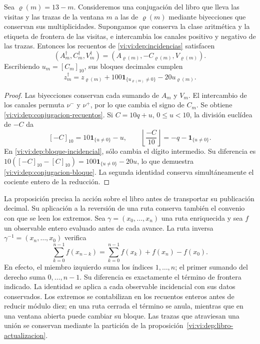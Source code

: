\begin{proposition}
\label{vi:vi:dep:conjugacion-incidencial}
Sea \(\varrho(m)=13-m\). Consideremos una conjugación del libro
que lleva las visitas y las trazas de la ventana \(m\) a las de
\(\varrho(m)\) mediante biyecciones que conservan sus multiplicidades.
Supongamos que conserva la clase aritmética y la etiqueta de frontera
de las visitas, e intercambia los canales positivo y negativo de las
trazas. Entonces los recuentos de \eqref{vi:vi:dep:incidencias} satisfacen
\begin{equation}
 (A_m^\dagger,C_m^\dagger,V_m^\dagger)
 =(A_{\varrho(m)},-C_{\varrho(m)},V_{\varrho(m)}).
 \label{vi:vi:dep:conjugacion-recuentos}
\end{equation}
Escribiendo \(u_m=[C_m]_{10}\), sus bloques decimales cumplen
\begin{equation}
 z_m^\dagger=z_{\varrho(m)}
       +100\mathbf1_{\{u_{\varrho(m)}\ne0\}}-20u_{\varrho(m)}.
 \label{vi:vi:dep:conjugacion-bloque}
\end{equation}
\end{proposition}
\begin{proof}
Las biyecciones conservan cada sumando de \(A_m\) y \(V_m\).
El intercambio de los canales permuta \(\nu^-\) y \(\nu^+\),
por lo que cambia el signo de \(C_m\). Se obtiene
\eqref{vi:vi:dep:conjugacion-recuentos}. Si \(C=10q+u\),
\(0\le u<10\), la división euclídea de \(-C\) da
\[
 [-C]_{10}=10\mathbf1_{\{u\ne0\}}-u,
 \qquad
 \left\lfloor\frac{-C}{10}\right\rfloor
 =-q-\mathbf1_{\{u\ne0\}}.
\]
En \eqref{vi:vi:dep:bloque-incidencial}, sólo cambia el dígito
intermedio. Su diferencia es
\(10([-C]_{10}-[C]_{10})=100\mathbf1_{\{u\ne0\}}-20u\),
lo que demuestra \eqref{vi:vi:dep:conjugacion-bloque}. La segunda
identidad conserva simultáneamente el cociente entero de la reducción.
\end{proof}

La proposición precisa la acción sobre el libro antes de transportar
su publicación decimal. Su aplicación a la reversión de una ruta
conserva también el convenio con que se leen los extremos. Sea
\(\gamma=(x_0,\ldots,x_n)\) una ruta enriquecida y sea \(f\) un
observable entero evaluado antes de cada avance. La ruta inversa
\(\gamma^{-1}=(x_n,\ldots,x_0)\) verifica
\begin{equation}
 \sum_{k=0}^{n-1}f(x_{n-k})
 =\sum_{k=0}^{n-1}f(x_k)+f(x_n)-f(x_0).
 \label{vi:vi:dep:conjugacion-frontera}
\end{equation}
En efecto, el miembro izquierdo suma los índices \(1,\ldots,n\);
el primer sumando del derecho suma \(0,\ldots,n-1\). Su diferencia
es exactamente el término de frontera indicado. La identidad se aplica
a cada observable incidencial con sus datos conservados. Los extremos
se contabilizan en los recuentos enteros antes de reducir módulo diez;
en una ruta cerrada el término se anula, mientras que en una ventana
abierta puede cambiar su bloque. Las trazas que atraviesan una unión
se conservan mediante la partición de la
proposición~\ref{vi:vi:dep:libro-actualizacion}.

